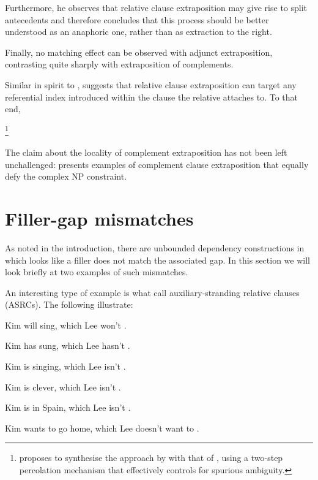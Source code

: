 \documentclass[output=paper
                ,modfonts
                ,nonflat
	        ,collection
	        ,collectionchapter
	        ,collectiontoclongg
 	        ,biblatex
                ,babelshorthands
                ,newtxmath
                ,draftmode
                ,colorlinks, citecolor=brown
]{./langsci/langscibook}
\begin{document}
{%

Furthermore, he observes that relative clause extraposition may give
rise to split antecedents and therefore concludes that this process
should be better understood as an anaphoric one, rather than as
extraction to the right.

Finally, no matching effect can be observed with adjunct
extraposition, contrasting quite sharply with extraposition of
complements. 


Similar in spirit to \citet{}, \citet{} suggests that relative clause
extraposition can target any referential index introduced within the
clause the relative attaches to.  To that end,

\footnote{\citet{} proposes to synthesise the approach by \citet{}
  with that of \citet{}, using a two-step percolation mechanism that
  effectively controls for spurious ambiguity.} 


The claim about the locality of complement extraposition has not been
left unchallenged: \citet{} presents examples of complement clause
extraposition that equally defy the complex NP constraint.



 

\section{Filler-gap mismatches}
\label{sec:UDC:FillerGapMismatches}

As noted in the introduction, there are unbounded dependency
constructions in which looks like a filler does not match the associated
gap. In this section we will look briefly at two examples of such
mismatches.

An interesting type of example is what \citet{Arnold:Borsley:10} call
auxiliary-stranding relative clauses (ASRCs). The following
illustrate:

\begin{exe}
  \ex \label{ex:UDC:ASRC}
  \begin{xlist}
    \ex Kim will sing, which Lee won't \gap{}.
    
    \ex Kim has sung, which Lee hasn't \gap{}.
    
    \ex Kim is singing, which Lee isn't \gap{}.
    
    \ex Kim is clever, which Lee isn't \gap{}.
    
    \ex Kim is in Spain, which Lee isn't \gap{}.
    
    \ex Kim wants to go home, which Lee doesn't want to \gap{}.
  \end{xlist}
\end{exe}

}
\end{document}
